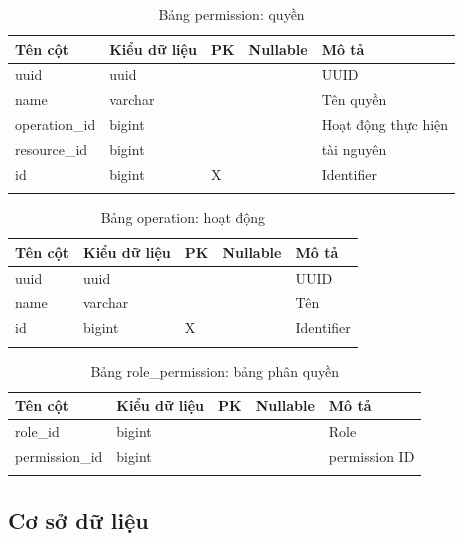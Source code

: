 \documentclass[report.tex]{subfiles}
\begin{document}
\begin{table}[!htb]
\begin{longtable}{|p{3cm}|p{3cm}|p{1cm}|p{1.6cm}|p{6cm}|}
\hline
\textbf{Tên cột} & \textbf{Kiểu dữ liệu} & \textbf{PK} & \textbf{Nullable} & \textbf{Mô tả} \\
\hline
uuid & uuid & & & UUID \\
name & varchar & & & Tên quyền \\
operation\_id & bigint & & & Hoạt động thực hiện \\
resource\_id & bigint & & & tài nguyên \\
id & bigint & X & & Identifier \\
\hline
\caption[Bảng permission]{Bảng permission: quyền}
\end{longtable}
\end{table}
\FloatBarrier

\begin{table}[!htb]
\begin{longtable}{|p{3cm}|p{3cm}|p{1cm}|p{1.6cm}|p{6cm}|}
\hline
\textbf{Tên cột} & \textbf{Kiểu dữ liệu} & \textbf{PK} & \textbf{Nullable} & \textbf{Mô tả} \\
\hline
uuid & uuid & & & UUID \\
name & varchar & & & Tên \\
id & bigint & X & & Identifier \\
\hline
\caption[Bảng operation]{Bảng operation: hoạt động}
\end{longtable}
\end{table}
\FloatBarrier

\begin{table}[!htb]
\begin{longtable}{|p{3cm}|p{3cm}|p{1cm}|p{1.6cm}|p{6cm}|}
\hline
\textbf{Tên cột} & \textbf{Kiểu dữ liệu} & \textbf{PK} & \textbf{Nullable} & \textbf{Mô tả} \\
\hline
role\_id & bigint & & & Role \\
permission\_id & bigint & & & permission ID \\
\hline
\caption[Bảng role\_permission]{Bảng role\_permission: bảng phân quyền}
\end{longtable}
\end{table}
\FloatBarrier

\subsection{Cơ sở dữ liệu}
\end{document}
